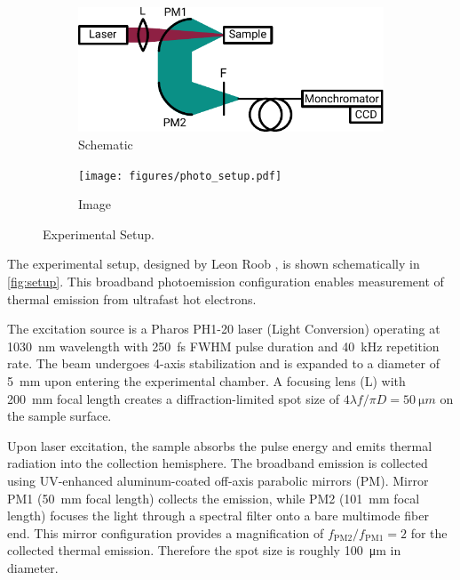 \documentclass[
	parskip=half,
	a4paper,
]{scrarticle}
\begin{document}
\begin{figure}
    \centering
     \begin{subfigure}{3.5in}
        \centering
        \includegraphics{figures/setup.pdf}
        \caption{Schematic}
    \end{subfigure}
    \hfill
    \begin{subfigure}{2in}
        \centering
        \texttt{[image: figures/photo\_setup.pdf]}
        \caption{Image}
    \end{subfigure}
    \caption{Experimental Setup.}
    \label{fig:setup}
\end{figure}

The experimental setup, designed by Leon Roob \cite{roob_thermal_2025}, is shown schematically in \autoref{fig:setup}. This broadband photoemission configuration enables measurement of thermal emission from ultrafast hot electrons.

The excitation source is a Pharos PH1-20 laser (Light Conversion) operating at \SI{1030}{nm} wavelength with \SI{250}{fs} FWHM pulse duration and \SI{40}{kHz} repetition rate. The beam undergoes 4-axis stabilization and is expanded to a diameter of \SI{5}{mm} upon entering the experimental chamber. A focusing lens (L) with \SI{200}{mm} focal length creates a diffraction-limited spot size of $4\lambda f / \pi D = \SI{50}{\micro m}$ on the sample surface.

Upon laser excitation, the sample absorbs the pulse energy and emits thermal radiation into the collection hemisphere. The broadband emission is collected using UV-enhanced aluminum-coated off-axis parabolic mirrors (PM). Mirror PM1 (\SI{50}{mm} focal length) collects the emission, while PM2 (\SI{101}{mm} focal length) focuses the light through a spectral filter onto a bare multimode fiber end.
This mirror configuration provides a magnification of $f_\text{PM2}/f_\text{PM1} = 2$ for the collected thermal emission. Therefore the spot size is roughly \SI{100}{\micro m} in diameter.
\end{document}
